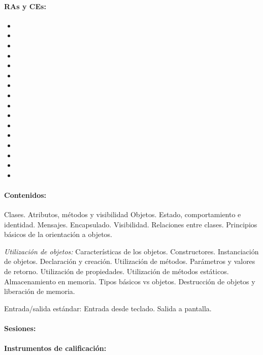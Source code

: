 	\paragraph{RAs y CEs:}
	\begin{itemize}[itemsep=0.1em, topsep=0.1em]
		\item\RAUNOf
		\item\RAUNOi		
		\item\RATRESe
		\item\RATRESf
		\item\RATRESg
		\item\RADOSa
		\item\RADOSb
		\item\RADOSc
		\item\RADOSd
		\item\RADOSe
		\item\RADOSf
		\item\RADOSh
		\item\RADOSi		
		\item\RACINCOa
		\item\RACINCOb
		\item\RACINCOc
	\end{itemize}

	\paragraph{Contenidos:}
		Clases. Atributos, métodos y visibilidad
		Objetos. Estado, comportamiento e identidad. Mensajes.
		Encapsulado. Visibilidad.
		Relaciones entre clases.
		Principios básicos de la orientación a objetos.

		\emph{Utilización de objetos:}
		Características de los objetos.
		Constructores.
		Instanciación de objetos. Declaración y creación.
		Utilización de métodos. Parámetros y valores de retorno.
		Utilización de propiedades.
		Utilización de métodos estáticos.
		Almacenamiento en memoria. Tipos básicos vs objetos.
		Destrucción de objetos y liberación de memoria.

		Entrada/salida estándar: Entrada desde teclado. Salida a pantalla.

	\paragraph{Sesiones:}
	\paragraph{Instrumentos de calificación:}



